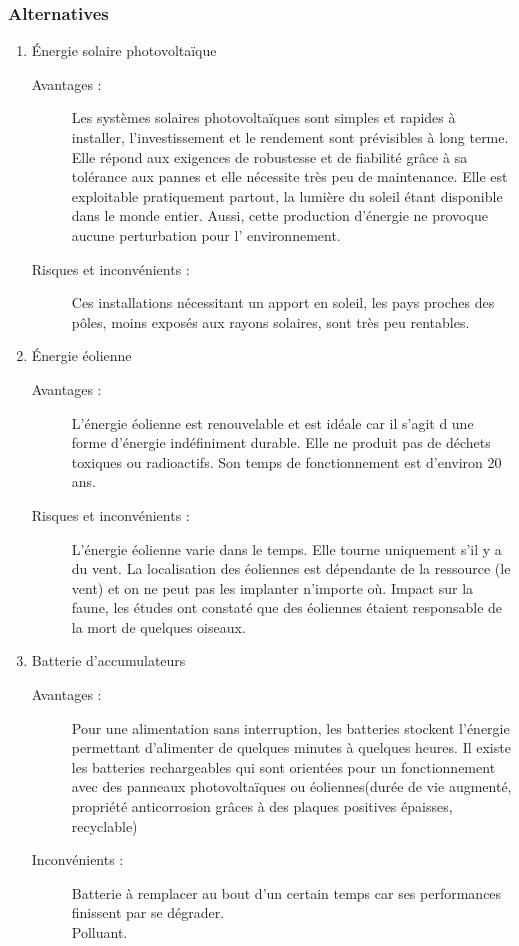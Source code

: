 \subsubsection{Alternatives}
\begin{enumerate}
\item Énergie solaire photovolta\"ique
\begin{description}
\item [Avantages : ]
Les systèmes solaires photovoltaïques sont simples et rapides à installer, l'investissement  et le rendement sont prévisibles à long terme.
Elle répond aux exigences de robustesse et de fiabilité grâce à sa tolérance aux pannes et elle nécessite très peu de maintenance. 
Elle est exploitable pratiquement partout, la lumière du soleil étant disponible dans le monde entier. %
Aussi, cette production d'énergie ne provoque aucune perturbation pour l' environnement.

\item [Risques et inconvénients : ]
Ces installations nécessitant un apport en soleil, les pays proches des pôles, moins exposés aux rayons solaires, sont très peu rentables.
\end{description}

\item Énergie éolienne
\begin{description}
\item [Avantages : ]
L'énergie éolienne est renouvelable et est idéale car il s'agit d une forme d'énergie indéfiniment durable.
Elle ne produit pas de déchets toxiques ou radioactifs. 
Son temps de fonctionnement est d'environ 20 ans.

\item [Risques et inconvénients : ]
L'énergie éolienne varie dans le temps.  Elle tourne uniquement s'il y a du vent.
La localisation des éoliennes est dépendante de la ressource (le vent) et on ne peut pas les implanter n'importe où. 
Impact sur la faune, les études ont constaté que des éoliennes étaient responsable de la mort de quelques oiseaux.
\end{description}


\item Batterie d'accumulateurs
\begin{description}
\item [Avantages : ]
Pour une alimentation sans interruption, les batteries stockent l'énergie permettant d'alimenter de quelques minutes à quelques heures.
Il existe les batteries rechargeables qui sont orientées pour un fonctionnement avec des panneaux photovoltaïques ou  éoliennes(durée de vie augmenté, propriété anticorrosion grâces à des plaques positives épaisses, recyclable)

\item [Inconvénients : ]
Batterie à remplacer au bout d'un certain temps car ses performances
finissent par se dégrader.\\ 
Polluant.

\end{description}
\end{enumerate}


